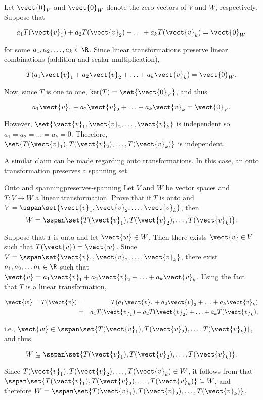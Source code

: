 \begin{solution}
Let $\vect{0}_V$ and $\vect{0}_W$ denote the zero vectors of $V$ and $W$,
respectively.
Suppose that 

\[ a_1T(\vect{v}_1) + a_2T(\vect{v}_2) +\ldots +a_kT(\vect{v}_k) =\vect{0}_W \]

for some $a_1, a_2, \ldots, a_k\in\R$.
Since linear transformations preserve linear combinations (addition
and scalar multiplication),

\[ T(a_1\vect{v}_1 + a_2\vect{v}_2 +\ldots +a_k\vect{v}_k) =\vect{0}_W. \]

Now, since $T$ is one to one, $\ker(T)=\set{\vect{0}_V}$, and thus

\[ a_1\vect{v}_1 + a_2\vect{v}_2 +\ldots +a_k\vect{v}_k =\vect{0}_V. \]

\noindent However, $\set{\vect{v}_1, \vect{v}_2, \ldots, \vect{v}_k}$ is independent so $a_1=a_2=\ldots=a_k=0$.
Therefore, $\set{T(\vect{v}_1), T(\vect{v}_2), \ldots, T(\vect{v}_k)}$
is independent.
\end{solution}

A similar claim can be made regarding onto transformations. In this case, an onto transformation preserves a spanning set.

\begin{example}{Onto and spanning}{preserves-spanning}
Let $V$ and $W$ be vector spaces and $T:V\to W$ a linear
transformation.
Prove that if $T$ is onto and
$V=\sspan\set{\vect{v}_1, \vect{v}_2, \ldots, \vect{v}_k}$,
then
\[ W=\sspan\set{T(\vect{v}_1), T(\vect{v}_2), \ldots, T(\vect{v}_k)}.\]
\end{example}

\begin{solution}
Suppose that $T$ is onto and let $\vect{w}\in W$.  
Then there exists $\vect{v}\in V$ such that $T(\vect{v})=\vect{w}$.
Since $V=\sspan\set{\vect{v}_1, \vect{v}_2, \ldots, \vect{v}_k}$, there
exist $a_1, a_2, \ldots a_k\in\R$ such that 
$\vect{v} = a_1\vect{v}_1 + a_2\vect{v}_2 + \ldots + a_k\vect{v}_k$.
Using the fact that $T$ is a linear transformation,

\begin{eqnarray*}
\vect{w}=T(\vect{v})
& = & T(a_1\vect{v}_1 + a_2\vect{v}_2 + \ldots + a_k\vect{v}_k) \\
& = & a_1T(\vect{v}_1) + a_2T(\vect{v}_2) + \ldots + a_kT(\vect{v}_k),
\end{eqnarray*}

i.e., $\vect{w}\in\sspan\set{T(\vect{v}_1), T(\vect{v}_2), \ldots, T(\vect{v}_k)}$,
and thus 

\[ W\subseteq \sspan\set{T(\vect{v}_1), T(\vect{v}_2), \ldots, T(\vect{v}_k)}.\]

Since $T(\vect{v}_1), T(\vect{v}_2), \ldots, T(\vect{v}_k)\in W$, 
it follows from
that
$\sspan\set{T(\vect{v}_1), T(\vect{v}_2), \ldots, T(\vect{v}_k)}\subseteq W$,
and therefore
$W=\sspan\set{T(\vect{v}_1), T(\vect{v}_2), \ldots, T(\vect{v}_k)}$.
\end{solution}
